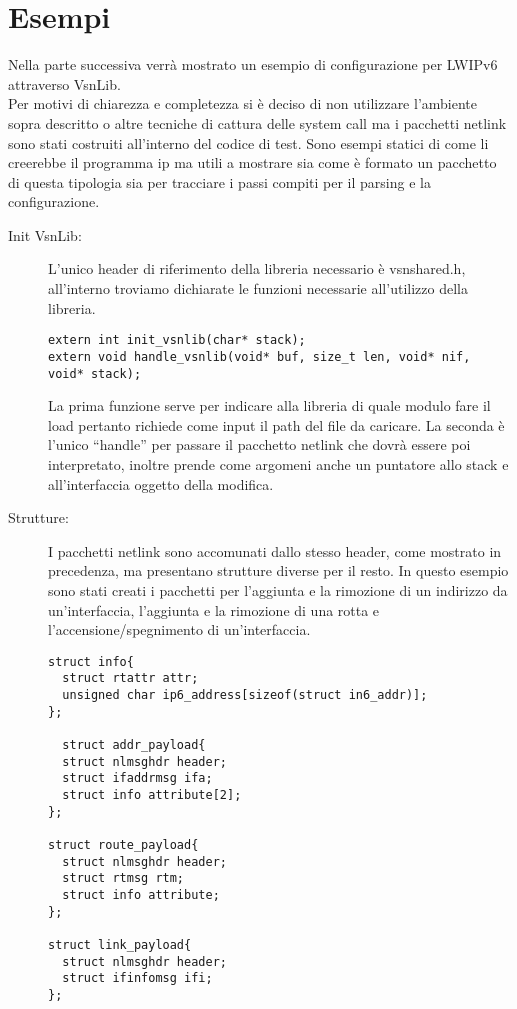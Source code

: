 \section{Esempi}                 %
Nella parte successiva verr\`a mostrato un esempio di configurazione per LWIPv6 attraverso VsnLib.\\
Per motivi di chiarezza e completezza si \`e deciso di non utilizzare l'ambiente sopra descritto o altre tecniche di cattura delle system call ma i pacchetti netlink sono stati costruiti all'interno del codice di test. Sono esempi statici di come li creerebbe il programma ip ma utili a mostrare sia come \`e formato un pacchetto di questa tipologia sia per tracciare i passi compiti per il parsing e la configurazione.
\begin{description}
\item[Init VsnLib: ]L'unico header di riferimento della libreria necessario \`e vsnshared.h, all'interno troviamo dichiarate le funzioni necessarie all'utilizzo della libreria.
\begin{lstlisting}[style=CStyle]
extern int init_vsnlib(char* stack);
extern void handle_vsnlib(void* buf, size_t len, void* nif, void* stack);
\end{lstlisting}
La prima funzione serve per indicare alla libreria di quale modulo fare il load pertanto richiede come input il path del file da caricare.
La seconda \`e l'unico ``handle'' per passare il pacchetto netlink che dovr\`a essere poi interpretato, inoltre prende come argomeni anche un puntatore allo stack e all'interfaccia oggetto della modifica.
\item[Strutture: ]I pacchetti netlink sono accomunati dallo stesso header, come mostrato in precedenza, ma presentano strutture diverse per il resto. In questo esempio sono stati creati i pacchetti per l'aggiunta e la rimozione di un indirizzo da un'interfaccia, l'aggiunta e la rimozione di una rotta e l'accensione/spegnimento di un'interfaccia.
\begin{lstlisting}[style=CStyle]
struct info{
  struct rtattr attr;
  unsigned char ip6_address[sizeof(struct in6_addr)];
};

  struct addr_payload{
  struct nlmsghdr header;
  struct ifaddrmsg ifa;
  struct info attribute[2];
};

struct route_payload{
  struct nlmsghdr header;
  struct rtmsg rtm;
  struct info attribute;
};

struct link_payload{
  struct nlmsghdr header;
  struct ifinfomsg ifi;
};


\end{lstlisting}
\end{description}
